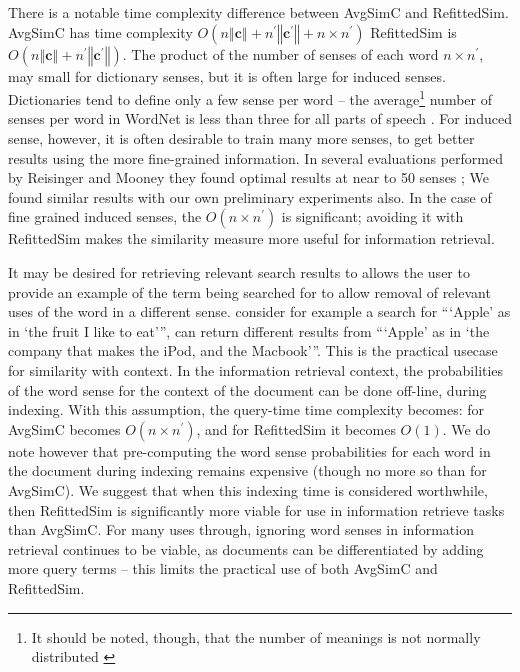 \documentclass{sig-alternate}
\renewcommand{\c}{\mathbf{c}}
\begin{document}
There is a notable time complexity difference between AvgSimC and RefittedSim.
AvgSimC has time complexity $O(n\left\Vert \c\right\Vert +n^{\prime}\left\Vert \c^{\prime}\right\Vert +n\times n^{\prime})$
RefittedSim is $O(n\left\Vert \c\right\Vert +n^{\prime}\left\Vert \c^{\prime}\right\Vert)$.
The product of the number of senses of each word $n \times n^\prime$, may small for dictionary senses, but it is often large for induced senses. Dictionaries tend to define only a few sense per word -- the average\footnote{It should be noted, though, that the number of meanings is not normally distributed \parencite{zipf1945meaning}} number of senses per word in WordNet is less than three for all parts of speech \parencite{miller1995wordnet}. For induced sense, however, it is often desirable to train many more senses, to get better results using the more fine-grained information. In several evaluations performed by Reisinger and Mooney they found optimal results at near to 50 senses \parencite{Reisinger2010}; We found similar results with our own preliminary experiments also. In the case of fine grained induced senses, the $O(n \times n^\prime)$ is significant; avoiding it with RefittedSim makes the similarity measure more useful for information retrieval.

It may be desired for retrieving relevant search results to allows the user to provide an example of the term being searched for to allow removal of relevant uses of the word in a different sense. consider for example a search for \enquote{\enquote{Apple} as in \enquote{the fruit I like to eat}}, can return different results from \enquote{\enquote{Apple} as in \enquote{the company that makes the iPod, and the Macbook}}. This is the practical usecase for similarity with context.
In the information retrieval context, the probabilities of the word sense for the context of the document can be done off-line, during indexing. With this assumption, the query-time time complexity becomes: for AvgSimC becomes $O(n\times n^{\prime})$, and for RefittedSim it becomes $O(1)$.
We do note however that pre-computing the word sense probabilities for each word in the document during indexing remains expensive (though no more so than for AvgSimC). We suggest that when this indexing time is considered worthwhile, then RefittedSim is significantly more viable for use in information retrieve tasks than AvgSimC. For many uses through, ignoring word senses in information retrieval continues to be viable, as documents can be differentiated by adding more query terms -- this limits the practical use of both AvgSimC and RefittedSim. 
\end{document}
